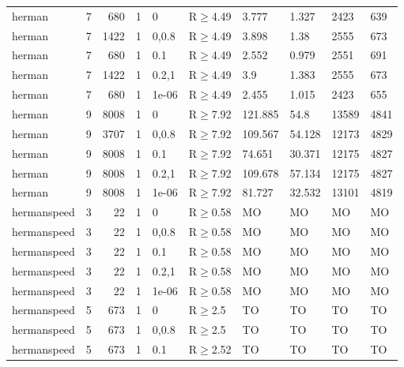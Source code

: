 \begin{longtable}{llrrllllll}
 herman        & 7        &    	680 & 1 & 0     & R$\geq$4.49  & 3.777    & 1.327    & 2423    & 639     \\
 herman        & 7        &   	1422 & 1 & 0,0.8 & R$\geq$4.49  & 3.898    & 1.38     & 2555    & 673     \\
 herman        & 7        &    	680 & 1 & 0.1   & R$\geq$4.49  & 2.552    & 0.979    & 2551    & 691     \\
 herman        & 7        &   	1422 & 1 & 0.2,1 & R$\geq$4.49  & 3.9      & 1.383    & 2555    & 673     \\
 herman        & 7        &    	680 & 1 & 1e-06 & R$\geq$4.49  & 2.455    & 1.015    & 2423    & 655     \\
 herman        & 9        &   	8008 & 1 & 0     & R$\geq$7.92  & 121.885  & 54.8     & 13589   & 4841    \\
 herman        & 9        &   	3707 & 1 & 0,0.8 & R$\geq$7.92  & 109.567  & 54.128   & 12173   & 4829    \\
 herman        & 9        &   	8008 & 1 & 0.1   & R$\geq$7.92  & 74.651   & 30.371   & 12175   & 4827    \\
 herman        & 9        &   	8008 & 1 & 0.2,1 & R$\geq$7.92  & 109.678  & 57.134   & 12175   & 4827    \\
 herman        & 9        &   	8008 & 1 & 1e-06 & R$\geq$7.92  & 81.727   & 32.532   & 13101   & 4819    \\
 hermanspeed   & 3        &     	22 & 1 & 0     & R$\geq$0.58  & MO       & MO       & MO      & MO      \\
 hermanspeed   & 3        &     	22 & 1 & 0,0.8 & R$\geq$0.58  & MO       & MO       & MO      & MO      \\
 hermanspeed   & 3        &     	22 & 1 & 0.1   & R$\geq$0.58  & MO       & MO       & MO      & MO      \\
 hermanspeed   & 3        &     	22 & 1 & 0.2,1 & R$\geq$0.58  & MO       & MO       & MO      & MO      \\
 hermanspeed   & 3        &     	22 & 1 & 1e-06 & R$\geq$0.58  & MO       & MO       & MO      & MO      \\
 hermanspeed   & 5        &    	673 & 1 & 0     & R$\geq$2.5   & TO       & TO       & TO      & TO      \\
 hermanspeed   & 5        &    	673 & 1 & 0,0.8 & R$\geq$2.5   & TO       & TO       & TO      & TO      \\
 hermanspeed   & 5        &    	673 & 1 & 0.1   & R$\geq$2.52  & TO       & TO       & TO      & TO      \\

\end{longtable}
